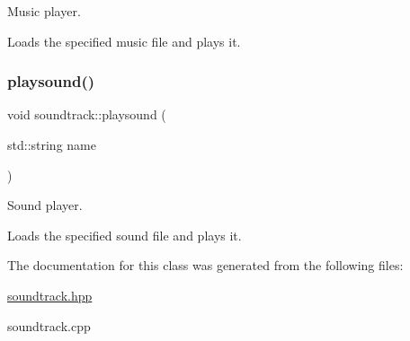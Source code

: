 Music player. 

Loads the specified music file and plays it. \mbox{\label{classsoundtrack_aa18de6469aca15922cfa8a8e8412f76d}} 
\subsubsection{\texorpdfstring{playsound()}{playsound()}}
{\footnotesize\ttfamily void soundtrack\+::playsound (\begin{DoxyParamCaption}\item[{std\+::string}]{name }\end{DoxyParamCaption})}



Sound player. 

Loads the specified sound file and plays it. 

The documentation for this class was generated from the following files\+:\begin{DoxyCompactItemize}
\item 
\hyperlink{soundtrack_8hpp}{soundtrack.\+hpp}\item 
soundtrack.\+cpp\end{DoxyCompactItemize}
